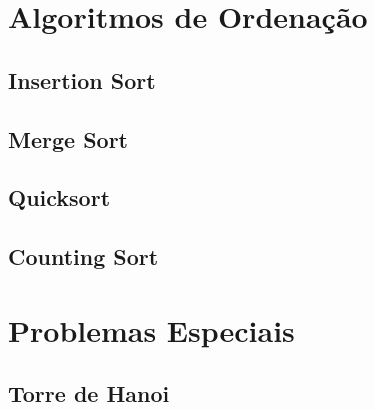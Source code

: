 % 


\section{Algoritmos de Ordenação}

\subsection{Insertion Sort}


\subsection{Merge Sort}


\subsection{Quicksort}


\subsection{Counting Sort}


\section{Problemas Especiais}

\subsection{Torre de Hanoi}


% 

